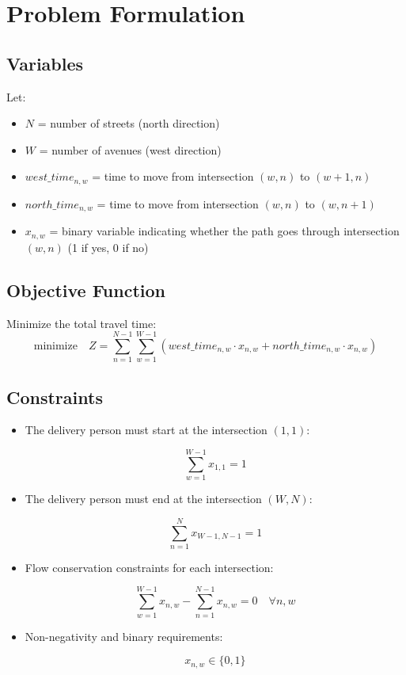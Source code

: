 \documentclass{article}
\begin{document}
\section*{Problem Formulation}

\subsection*{Variables}
Let:
\begin{itemize}
    \item \( N \) = number of streets (north direction)
    \item \( W \) = number of avenues (west direction)
    \item \( west\_time_{n,w} \) = time to move from intersection \( (w, n) \) to \( (w+1, n) \)
    \item \( north\_time_{n,w} \) = time to move from intersection \( (w, n) \) to \( (w, n+1) \)
    \item \( x_{n,w} \) = binary variable indicating whether the path goes through intersection \( (w,n) \) (1 if yes, 0 if no)
\end{itemize}

\subsection*{Objective Function}
Minimize the total travel time:
\[
\text{minimize} \quad Z = \sum_{n=1}^{N-1} \sum_{w=1}^{W-1} \left( west\_time_{n,w} \cdot x_{n,w} + north\_time_{n,w} \cdot x_{n,w} \right)
\]

\subsection*{Constraints}
\begin{itemize}
    \item The delivery person must start at the intersection \( (1,1) \):

    \[
    \sum_{w=1}^{W-1} x_{1,1} = 1
    \]

    \item The delivery person must end at the intersection \( (W,N) \):

    \[
    \sum_{n=1}^{N} x_{W-1,N-1} = 1
    \]

    \item Flow conservation constraints for each intersection:

    \[
    \sum_{w=1}^{W-1} x_{n,w} - \sum_{n=1}^{N-1} x_{n,w} = 0 \quad \forall n, w
    \]

    \item Non-negativity and binary requirements:

    \[
    x_{n,w} \in \{0, 1\} 
    \]
\end{itemize}
\end{document}
